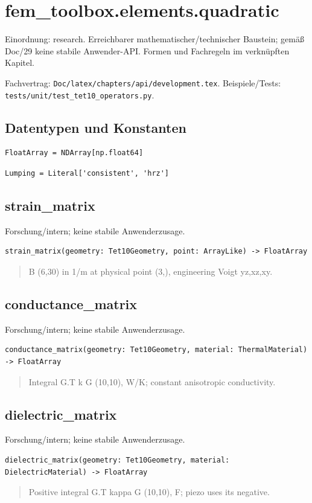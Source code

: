 \section{fem\_toolbox.elements.quadratic}
Einordnung: research. Erreichbarer mathematischer/technischer Baustein; gemäß Doc/29 keine stabile Anwender-API. Formen und Fachregeln im verknüpften Kapitel.
\par Fachvertrag: \nolinkurl{Doc/latex/chapters/api/development.tex}. Beispiele/Tests:
\nolinkurl{tests/unit/test_tet10_operators.py}.
\subsection*{Datentypen und Konstanten}
\begin{lstlisting}
FloatArray = NDArray[np.float64]
\end{lstlisting}
\begin{lstlisting}
Lumping = Literal['consistent', 'hrz']
\end{lstlisting}
\subsection{strain\_matrix}
Forschung/intern; keine stabile Anwenderzusage.
\begin{lstlisting}
strain_matrix(geometry: Tet10Geometry, point: ArrayLike) -> FloatArray
\end{lstlisting}
\begin{quote}
B (6,30) in 1/m at physical point (3,), engineering Voigt yz,xz,xy.
\end{quote}
\subsection{conductance\_matrix}
Forschung/intern; keine stabile Anwenderzusage.
\begin{lstlisting}
conductance_matrix(geometry: Tet10Geometry, material: ThermalMaterial) -> FloatArray
\end{lstlisting}
\begin{quote}
Integral G.T k G (10,10), W/K; constant anisotropic conductivity.
\end{quote}
\subsection{dielectric\_matrix}
Forschung/intern; keine stabile Anwenderzusage.
\begin{lstlisting}
dielectric_matrix(geometry: Tet10Geometry, material: DielectricMaterial) -> FloatArray
\end{lstlisting}
\begin{quote}
Positive integral G.T kappa G (10,10), F; piezo uses its negative.
\end{quote}
